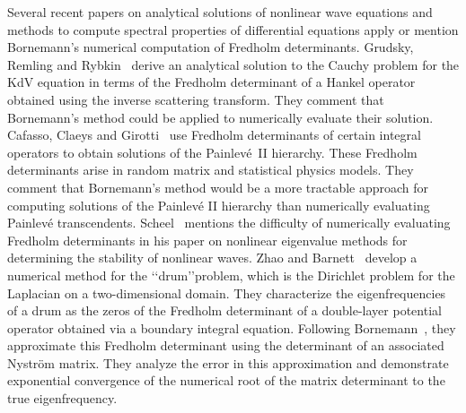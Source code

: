 \documentclass{birkjour}
\theoremstyle{definition}
\theoremstyle{remark}
\numberwithin{equation}{section}
\begin{document}
Several recent papers on analytical solutions of nonlinear wave equations
and methods to compute spectral properties of  differential equations
apply or mention Bornemann's numerical computation of Fredholm determinants.
 Grudsky, Remling and Rybkin~\cite{Grudsky2015Inverse} 
 derive an analytical solution to the Cauchy problem
 for the KdV equation  in terms of the Fredholm determinant of 
 a Hankel operator obtained using the inverse scattering transform.
 They comment that Bornemann's method 
 could be applied to numerically evaluate their solution.
Cafasso, Claeys and Girotti~\cite{cafasso2021fredholm} 
use Fredholm determinants of certain integral
operators   to obtain solutions of the Painlev\'e~II hierarchy. 
These Fredholm determinants arise in 
random matrix and statistical physics models. They comment that 
Bornemann's method 
would be a more tractable approach for computing solutions of the
Painlev\'e II hierarchy than  numerically evaluating  Painlev\'e transcendents. 
Scheel~\cite{Scheel20223Nonlinear} mentions the difficulty of numerically evaluating 
Fredholm determinants in his paper on nonlinear
eigenvalue methods for determining  the stability of nonlinear waves. 
Zhao and Barnett~\cite{zhao2015robust} develop a numerical method 
for the \lq\lq drum\rq\rq problem, which is the Dirichlet problem 
 for the Laplacian on a two-dimensional
domain. They characterize the eigenfrequencies of a drum as the zeros
of the Fredholm determinant of a double-layer potential operator 
obtained via a boundary integral equation. Following Bornemann~\cite{Bornemann}, they 
approximate this Fredholm determinant using the  determinant of an 
associated Nystr\"om matrix. They analyze the error in this approximation
and demonstrate exponential convergence of the numerical root of the
matrix determinant  to the true eigenfrequency. 
 
\end{document}
